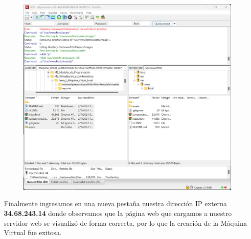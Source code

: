 \documentclass[12pt,a4paper]{article}
\begin{document}
\begin{figure}[H]
    \centering
    \includegraphics[width=1\linewidth]{M4_Servicios_Cómputo_en_la_Nube/Tarea_5_Creación_Máquinas_Virtuales_en_Nube/reporte/figuras/2_4_1_Carga_archivos.png}
    \label{fig:Google_6}
\end{figure}

\vspace{5em}

Finalmente ingresamos en una nueva pestaña nuestra dirección IP externa \textbf{34.68.243.14} donde observamos que la página web que cargamos a nuestro servidor web se visualizó de forma correcta, por lo que la creación de la Máquina Virtual fue exitosa.
\end{document}
